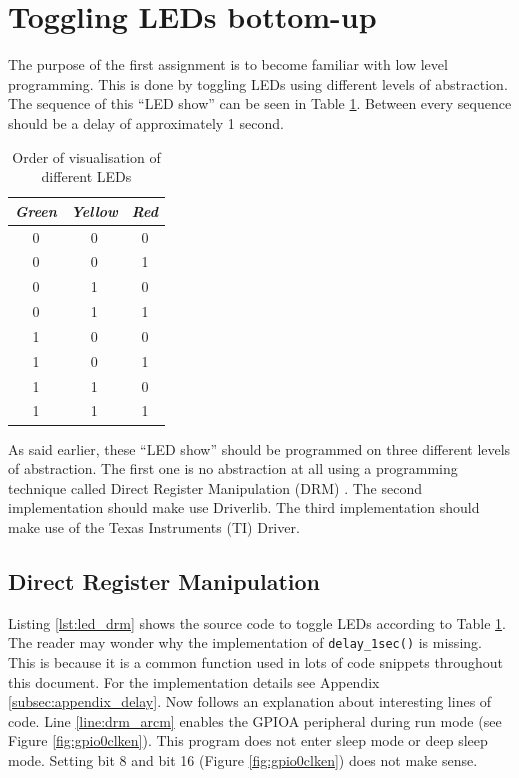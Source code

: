 \section{Toggling LEDs bottom-up}

The purpose of the first assignment is to become familiar with low level programming.
This is done by toggling LEDs using different levels of abstraction.
The sequence of this \enquote{LED show} can be seen in Table \ref{tab:led_scheme}.
Between every sequence should be a delay of approximately 1 second.

\begin{table}[H]
    \centering
    \begin{tabular}{|c|c|c|}
        \hline
        \textcolor{darkpink}{\textit{Green}} & \textcolor{darkpink}{\textit{Yellow}} & \textcolor{darkpink}{\textit{Red}}\\
        \hline
        0 & 0 & 0 \\
        \hline
        0 & 0 & 1 \\
        \hline
        0 & 1 & 0 \\
        \hline
        0 & 1 & 1 \\
        \hline
        1 & 0 & 0 \\
        \hline
        1 & 0 & 1 \\
        \hline
        1 & 1 & 0 \\
        \hline
        1 & 1 & 1 \\
        \hline
    \end{tabular}
        
    \label{tab:led_scheme}
    \caption{Order of visualisation of different LEDs}
\end{table}

As said earlier, these \enquote{LED show} should be programmed on three different levels of abstraction.
The first one is no abstraction at all using a programming technique called Direct Register Manipulation (DRM) \cite{IntroEmbeddedSystems}.
The second implementation should make use Driverlib.
The third implementation should make use of the Texas Instruments (TI) Driver.

\newpage
\subsection{Direct Register Manipulation}

Listing \ref{lst:led_drm} shows the source code to toggle LEDs according to Table \ref{tab:led_scheme}.
The reader may wonder why the implementation of \texttt{delay\_1sec()} is missing. 
This is because it is a common function used in lots of code snippets throughout this document.
For the implementation details see Appendix \ref{subsec:appendix_delay}.
Now follows an explanation about interesting lines of code.
Line \ref{line:drm_arcm} enables the GPIOA peripheral during run mode (see Figure \ref{fig:gpio0clken}).
This program does not enter sleep mode or deep sleep mode. Setting bit 8 and bit 16 (Figure \ref{fig:gpio0clken}) does not make sense.

